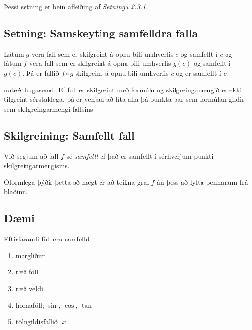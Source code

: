 \documentclass[b5paper,10pt,icelandic]{sphinxmanual}
\begin{document}
Þessi setning er bein afleiðing af {\hyperref[kafli02:setning\string-markgildi]{\emph{Setningu 2.3.1}}}.


\subsection{Setning: Samskeyting samfelldra falla}
\label{kafli02:setning-samskeyting-samfelldra-falla}
Látum \(g\) vera fall sem er skilgreint á opnu bili umhverfis
\(c\) og samfellt í \(c\) og látum \(f\) vera fall sem er
skilgreint á opnu bili umhverfis \(g(c)\) og samfellt í
\(g(c)\). Þá er fallið \(f\circ g\) skilgreint á opnu bili
umhverfis \(c\) og er samfellt í \(c\).

\begin{notice}{note}{Athugasemd:}
Ef fall er skilgreint með formúlu og skilgreingamengið er ekki tilgreint
sérstaklega, þá er venjan að líta alla þá punkta þar sem formúlan gildir
sem skilgreingarmengi fallsins
\end{notice}


\subsection{Skilgreining: Samfellt fall}
\label{kafli02:index-9}\label{kafli02:skilgreining-samfellt-fall}\label{kafli02:skilgrsamfellt}
Við segjum að fall \(f\) sé \textit{samfellt} ef það er samfellt í
sérhverjum punkti skilgreingarmengisins.

Óformlega þýðir þetta að hægt er að teikna graf \(f\) án þess að lyfta pennanum frá blaðinu.


\subsection{Dæmi}
\label{kafli02:id13}
Eftirfarandi föll eru samfelld
\begin{enumerate}
\item {} 
margliður

\item {} 
ræð föll

\item {} 
ræð veldi

\item {} 
hornaföll; \(\sin\), \(\cos\), \(\tan\)

\item {} 
tölugildisfallið \(|x|\)

\end{enumerate}
\end{document}
